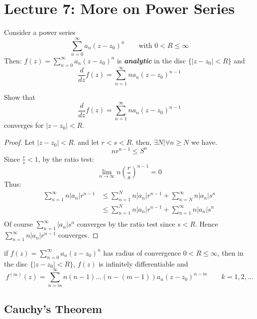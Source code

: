 \chapter{Lecture 7: More on Power Series}

\begin{theorem}
    Consider a power series
    $$ \sum_{n=0}^{\infty} a_n (z-z_0)^n \qquad \text{with } 0 < R \leq \infty $$
    Then: $f(z) = \sum_{n=0}^{\infty} a_n (z-z_0)^n$ is \textbf{\textit{analytic}} in the disc $\{|z-z_0| < R\}$ and
    $$\frac{d }{dz} f(z)= \sum_{n=1}^{\infty} n a_n (z-z_0)^{n-1} $$
\end{theorem}

\begin{example}
    Show that
    $$\frac{d }{dz} f(z)= \sum_{n=1}^{\infty} n a_n (z-z_0)^{n-1} $$
    converges for $|z-z_0| < R$.

    \begin{proof}
        Let $|z-z_0| < R$. and let $r < s < R$. then, $\exists N | \forall n \geq N$ we have.
        $$nr^{n -1} \leq S^n$$
        Since $\frac{r}{s} < 1$, by the ratio test:
        $$\lim_{n \to \infty} n(\frac{r}{s})^{n-1} = 0$$
        Thus:
        \begin{align*}
            \sum_{n  = 1}^{\infty} n|a_n|r^{n - 1} & \leq \sum_{n = 1}^{N} n|a_n|r^{n - 1} + \sum_{n = N}^{\infty} n|a_n|s^{n} \\
                                                   & \leq \sum_{n = 1}^{N} n|a_n|r^{n - 1} + \sum_{n = 1}^{\infty} n|a_n|s^{n} \\
        \end{align*}
        Of course $\sum_{n = 1}^{\infty} |a_n|s^{n}$ converges by the ratio test since $s < R$. Hence $\sum_{n = 1}^{\infty} n|a_n|r^{n - 1}$ converges.
    \end{proof}
\end{example}

\begin{theorem}
    if $f(z) = \sum_{n=0}^{\infty} a_n (z-z_0)^n$ has radius of convergence $0 < R \leq \infty$, then in the disc $\{|z-z_0| < R\}$, $f(z)$ is infinitely differentiable and
    $$f^{(m)}(z) = \sum_{n=m}^{\infty} n(n-1)\ldots(n-(m-1)) a_n (z-z_0)^{n-m} \qquad k = 1, 2, \ldots $$
\end{theorem}

\section{Cauchy's Theorem}

